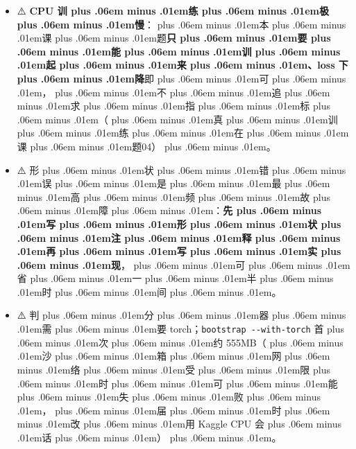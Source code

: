 \documentclass[
]{article}
\newcommand{\passthrough}[1]{#1}
\providecommand{\tightlist}{%
  \setlength{\itemsep}{0pt}\setlength{\parskip}{0pt}}
\def\zh#1{{\zhfont #1}}
\def\sym#1{{\symfont #1}}
\def\zhglue{\hskip0pt plus .06em minus .01em}
\begin{document}
\begin{itemize}
\tightlist
\item
  \sym{⚠️} \textbf{CPU \zh{训\zhglue 练\zhglue 极\zhglue 慢}}\zh{：\zhglue 本\zhglue 课\zhglue 题}\textbf{\zh{只\zhglue 要\zhglue 能\zhglue 训\zhglue 起\zhglue 来\zhglue 、}loss \zh{下\zhglue 降}}\zh{即\zhglue 可\zhglue ，\zhglue 不\zhglue 追\zhglue 求\zhglue 指\zhglue 标\zhglue （\zhglue 真\zhglue 训\zhglue 练\zhglue 在\zhglue 课\zhglue 题}04\zh{）\zhglue 。}
\item
  \sym{⚠️} \zh{形\zhglue 状\zhglue 错\zhglue 误\zhglue 是\zhglue 最\zhglue 高\zhglue 频\zhglue 故\zhglue 障\zhglue ：}\textbf{\zh{先\zhglue 写\zhglue 形\zhglue 状\zhglue 注\zhglue 释\zhglue 再\zhglue 写\zhglue 实\zhglue 现}}\zh{，\zhglue 可\zhglue 省\zhglue 一\zhglue 半\zhglue 时\zhglue 间\zhglue 。}
\item
  \sym{⚠️} \zh{判\zhglue 分\zhglue 器\zhglue 需\zhglue 要} torch\zh{；}\passthrough{\lstinline!bootstrap --with-torch!} \zh{首\zhglue 次\zhglue 约} 555MB\zh{（\zhglue 沙\zhglue 箱\zhglue 网\zhglue 络\zhglue 受\zhglue 限\zhglue 时\zhglue 可\zhglue 能\zhglue 失\zhglue 败\zhglue ，\zhglue 届\zhglue 时\zhglue 改\zhglue 用} Kaggle CPU \zh{会\zhglue 话\zhglue ）\zhglue 。}
\end{itemize}
\end{document}
